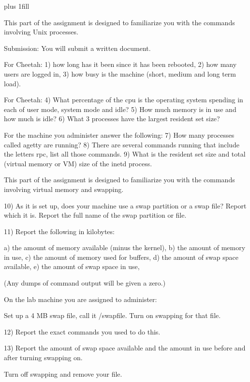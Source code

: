 
\rightskip=0pt plus 1fill

\parindent 0pt

This part of the assignment is designed to familiarize you with the
commands involving Unix processes.

Submission: You will submit a written document.

For Cheetah: 1) how long has it been since it has
been rebooted, 2) how many users are logged in, 3) how busy is the machine
(short, medium and long term load).

For Cheetah: 4) What percentage of the cpu is the operating system
spending in each of user mode, system mode and idle?
5) How much memory is in use and
how much is idle?
6) What 3 processes have the largest resident set size?

For the machine you administer answer the following:
7) How many processes called {\ltt{}agetty} are running?
8) There are several commands running that include the letters {\ltt{}rpc},
list all those commands.
9) What is the resident set size and total (virtual memory or VM) size of the
{\ltt{}inetd} process.

This part of the assignment is designed to familiarize you with the
commands involving virtual memory and swapping.

10) As it is set up,
does your machine use a swap partition or a swap file? 
Report which it is.
Report the full name of the swap partition or file.

11) Report the following in kilobytes:

a) the amount of memory available (minus the kernel),
\break
b) the amount of memory in use,
\break
c) the amount of memory used for buffers,
\break
d) the amount of swap space available,
\break
e) the amount of swap space in use,

(Any dumps of command output will be given a zero.)

On the lab machine you are assigned to administer:

Set up a 4 MB swap file, call it {\ltt{}/swapfile}.
Turn on swapping for that file.

12) Report the exact commands you used to do this.

13) Report the amount of swap space available and the amount in use
before and after turning swapping on.

Turn off swapping and remove your file.

